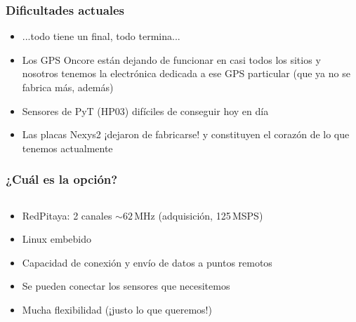 \documentclass{beamer}
\begin{document}
\begin{frame}
	\frametitle{Dificultades actuales}
	\begin{alertblock}{}
		\begin{itemize}
		\item ...todo tiene un final, todo termina...
		\item Los GPS Oncore están dejando de funcionar en casi todos los sitios y
						nosotros tenemos la electrónica dedicada a ese GPS particular (\alert{que ya no se
										fabrica más}, además)
		\item Sensores de PyT (HP03) difíciles de conseguir hoy en día
		\item Las placas Nexys2 \alert{¡dejaron de fabricarse!} y constituyen el
					corazón de lo que tenemos actualmente
		\end{itemize}
	\end{alertblock}
\end{frame} 

\begin{frame}
	\frametitle{¿Cuál es la opción?}
	\begin{columns}
		\begin{column}{0.60\textwidth}
			\begin{block}{}
	    	\begin{itemize} %
								\item RedPitaya: 2 canales $\sim 62\,\text{MHz}$ (adquisición, 125\,MSPS)
								\item \alert{Linux embebido}
	      	\item Capacidad de conexión y envío de datos a puntos remotos
	      	\item Se pueden conectar los sensores que necesitemos 
					\item Mucha \alert{flexibilidad} (¡justo lo que queremos!)
	    	\end{itemize}
			\end{block}
		\end{column} 
	 	\begin{column}{0.4\textwidth}
	 \end{column}
	\end{columns}
\end{frame} 
\end{document}
